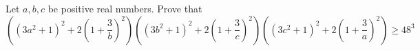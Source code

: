 Let $a,b,c$ be positive real numbers. Prove that \[\left((3a^2+1)^2+2\left(1+\frac{3}{b}\right)^2\right)\left((3b^2+1)^2+2\left(1+\frac{3}{c}\right)^2\right)\left((3c^2+1)^2+2\left(1+\frac{3}{a}\right)^2\right)\geq 48^3\]